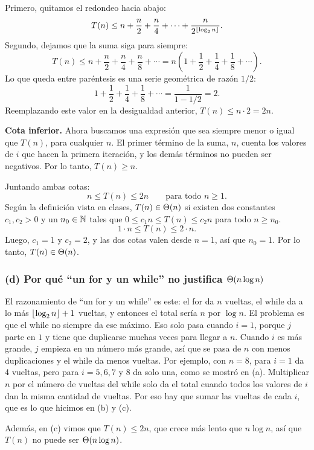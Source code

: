 Primero, quitamos el redondeo hacia abajo:
\[
  T(n) \le n + \frac{n}{2} + \frac{n}{4} + \cdots + \frac{n}{2^{\lfloor\log_2 n\rfloor}}.
\]
Segundo, dejamos que la suma siga para siempre:
\[
  T(n) \le n + \frac{n}{2} + \frac{n}{4} + \frac{n}{8} + \cdots
       = n \left( 1 + \frac{1}{2} + \frac{1}{4} + \frac{1}{8} + \cdots \right).
\]
Lo que queda entre paréntesis es una serie geométrica de razón $1/2$:
\[
  1 + \frac{1}{2} + \frac{1}{4} + \frac{1}{8} + \cdots = \frac{1}{1 - 1/2} = 2.
\]
Reemplazando este valor en la desigualdad anterior, $T(n) \le n \cdot 2 = 2n$.

\textbf{Cota inferior.} Ahora buscamos una expresión que sea siempre menor o igual que
$T(n)$, para cualquier $n$. El primer término de la suma, $n$, cuenta los valores de $i$
que hacen la primera iteración, y los demás términos no pueden ser negativos. Por lo
tanto, $T(n) \ge n$.

Juntando ambas cotas:
\[
  n \le T(n) \le 2n \qquad \text{para todo } n \ge 1.
\]
Según la definición vista en clases, $T(n) \in \Theta\!\left(n\right)$ si existen dos constantes
$c_1, c_2 > 0$ y un $n_0 \in \mathbb{N}$ tales que $0 \le c_1 n \le T(n) \le c_2 n$ para todo
$n \ge n_0$. \[
  1 \cdot n \le T(n) \le 2 \cdot n.
\]
Luego, $c_1 = 1$ y $c_2 = 2$, y las dos cotas valen desde $n = 1$, así que $n_0 = 1$. Por
lo tanto, $T(n) \in \Theta\!\left(n\right)$.

\subsubsection*{(d) Por qué ``un for y un while'' no justifica $\Theta\!\left(n\log n\right)$}

El razonamiento de ``un for y un while'' es este: el for da $n$ vueltas, el while da a
lo más $\lfloor\log_2 n\rfloor + 1$ vueltas, y entonces el total sería $n$ por $\log n$. El
problema es que el while no siempre da ese máximo. Eso solo pasa cuando $i = 1$, porque
$j$ parte en $1$ y tiene que duplicarse muchas veces para llegar a $n$. Cuando $i$ es más
grande, $j$ empieza en un número más grande, así que se pasa de $n$ con menos
duplicaciones y el while da menos vueltas. Por ejemplo, con
$n = 8$, para $i = 1$ da 4 vueltas, pero para $i = 5, 6, 7$ y $8$ da solo una, como se
mostró en (a). Multiplicar $n$ por el número de vueltas del while solo da el total cuando todos los
valores de $i$ dan la misma cantidad de vueltas. Por eso hay que sumar las
vueltas de cada $i$, que es lo que hicimos en (b) y (c).

Además, en (c) vimos que $T(n) \le 2n$, que crece más lento que $n\log n$, así que $T(n)$
no puede ser $\Theta\!\left(n\log n\right)$.
